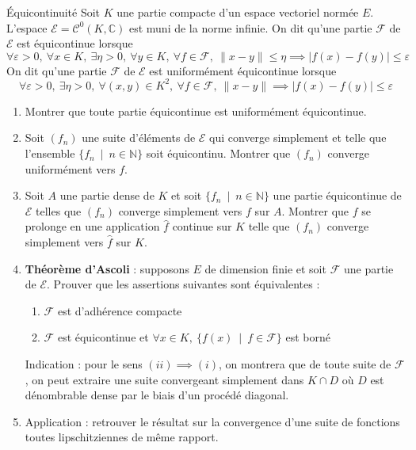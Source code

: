 \documentclass[french,a4paper]{article}
\newcommand{\N}{\mathbb{N}}
\newcommand{\C}{\mathbb{C}}
\theoremstyle{plain}
\theoremstyle{definition}
\theoremstyle{remark}
\begin{document}
\begin{ex}[Châteaux]{Équicontinuité}
	Soit $K$ une partie compacte d'un espace vectoriel normée $E$. L'espace $\mathcal{E}=\mathcal{C}^0(K,\C)$ est muni de la norme infinie. On dit qu'une partie $\mathcal{F}$ de $\mathcal{E}$ est équicontinue lorsque $$\forall\varepsilon>0,\ \forall x\in K,\ \exists\eta>0,\ \forall y\in K,\ \forall f\in\mathcal{F},\ \lVert x-y\rVert\leqslant\eta\implies\lvert f(x)-f(y)\rvert\leqslant\varepsilon$$ On dit qu'une partie $\mathcal{F}$ de $\mathcal{E}$ est uniformément équicontinue lorsque $$\forall\varepsilon>0,\ \exists\eta>0,\ \forall(x,y)\in K^2,\ \forall f\in\mathcal{F},\ \lVert x-y\rVert\implies\lvert f(x)-f(y)\rvert\leqslant\varepsilon$$
	\begin{enumerate}
		\item Montrer que toute partie équicontinue est uniformément équicontinue.
		\item Soit $(f_n)$ une suite d'éléments de $\mathcal{E}$ qui converge simplement et telle que l'ensemble $\{f_n\ \mid\ n\in\N\}$ soit équicontinu. Montrer que $(f_n)$ converge uniformément vers $f$.
		\item Soit $A$ une partie dense de $K$ et soit $\{f_n\ \mid\ n\in\N\}$ une partie équicontinue de $\mathcal{E}$ telles que $(f_n)$ converge simplement vers $f$ sur $A$. Montrer que $f$ se prolonge en une application $\hat{f}$ continue sur $K$ telle que $(f_n)$ converge simplement vers $\hat{f}$ sur $K$.
		\item \textbf{Théorème d'Ascoli} : supposons $E$ de dimension finie et soit $\mathcal{F}$ une partie de $\mathcal{E}$. Prouver que les assertions suivantes sont équivalentes :
		\begin{enumerate}[label=(\roman*)]
			\item $\mathcal{F}$ est d'adhérence compacte
			\item $\mathcal{F}$ est équicontinue et $\forall x\in K,\ \{f(x)\ \mid \ f\in\mathcal{F}\}$ est borné
		\end{enumerate}
		Indication : pour le sens $(ii)\implies(i)$, on montrera que de toute suite de $\mathcal{F}$, on peut extraire une suite convergeant simplement dans $K\cap D$ où $D$ est dénombrable dense par le biais d'un procédé diagonal.
		\item Application : retrouver le résultat sur la convergence d'une suite de fonctions toutes lipschitziennes de même rapport.
	\end{enumerate}
\end{ex}
\end{document}
